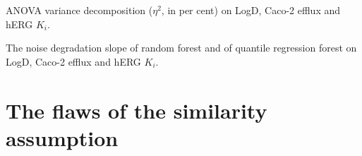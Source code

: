 \label{app:noise:sec:assay_variance_decomposition}
ANOVA variance decomposition ($\eta^2$, in per cent) on LogD, Caco-2 efflux and hERG $K_i$.


\label{app:noise:sec:rf_vs_qrf_assay}
The noise degradation slope of random forest and of quantile regression forest on LogD, Caco-2 efflux and hERG $K_i$.


\section{The flaws of the similarity assumption}\label{app:add:flaws}

